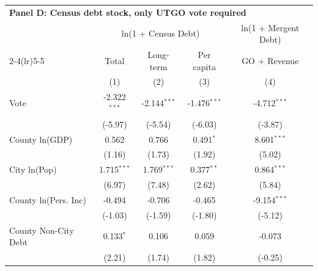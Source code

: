 \begingroup
\centering
\begin{tabular*}{\textwidth}{@{\extracolsep{\fill}}lcccc}
\multicolumn{5}{l}{\textbf{Panel D: Census debt stock, only UTGO vote required}}\\

\addlinespace
   \toprule
                        & \multicolumn{3}{c}{ln(1 + Census Debt)} & \multicolumn{1}{c}{ln(1 + Mergent Debt)}\\  
   \cmidrule(lr){2-4}\cmidrule(lr){5-5}
                        & Total                     & Long-term                     & Per capita                           & GO + Revenue \\   
                        & (1)                       & (2)                           & (3)                                  & (4)\\  
   \midrule 
   Vote                 & -2.322$^{***}$            & -2.144$^{***}$                & -1.476$^{***}$                       & -4.712$^{***}$\\   
                        & (-5.97)                  & (-5.54)                      & (-6.03)                             & (-3.87)\\   
   County ln(GDP)       & 0.562                     & 0.766                         & 0.491$^{*}$                          & 8.601$^{***}$\\   
                        & (1.16)                   & (1.73)                       & (1.92)                              & (5.02)\\   
   City ln(Pop)         & 1.715$^{***}$             & 1.769$^{***}$                 & 0.377$^{**}$                         & 0.864$^{***}$\\   
                        & (6.97)                   & (7.48)                       & (2.62)                              & (5.84)\\   
   County ln(Pers. Inc) & -0.494                    & -0.706                        & -0.465                               & -9.154$^{***}$\\   
                        & (-1.03)                  & (-1.59)                      & (-1.80)                             & (-5.12)\\   
   County Non-City Debt & 0.133$^{*}$               & 0.106                         & 0.059                                & -0.073\\   
                        & (2.21)                   & (1.74)                       & (1.82)                              & (-0.25)\\   

\end{tabular*}
